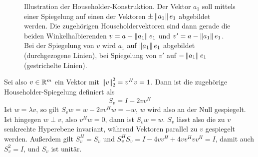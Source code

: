 \begin{figure}
  \centering

  \caption{Illustration der Householder-Konstruktion. Der Vektor $a_1$
    soll mittels einer Spiegelung auf einen der Vektoren
    $\pm\left\lVert{a_1}\right\rVert e_1$ abgebildet werden. Die zugehörigen
    Householdervektoren sind dann gerade die beiden Winkelhalbierenden
    $v=a+\left\lVert{a_1}\right\rVert e_1$ und $v'=a-\left\lVert{a_1}\right\rVert e_1$. Bei der Spiegelung
    von $v$ wird $a_1$ auf $\left\lVert{a_1}\right\rVert e_1$ abgebildet (durchgezogene
    Linien), bei Spiegelung von $v'$ auf $-\left\lVert{a_1}\right\rVert e_1$
    (gestrichelte Linien).}
  \label{fig:householder}
\end{figure}

Sei also $v\in\mathbb{R}^m$ ein Vektor mit $\left\lVert{v}\right\rVert^2_2=v^Hv=1$. Dann ist die
zugehörige Householder-Spiegelung definiert als
\begin{equation}
  S_v = I - 2vv^H
\end{equation}
Ist $w = \lambda v$, so gilt $S_vw = w - 2vv^Hw = -w$, $w$ wird also
an der Null gespiegelt. Ist hingegen $w\perp v$, also $v^Hw=0$, dann
ist $S_vw = w$. $S_v$ lässt also die zu $v$ senkrechte Hyperebene
invariant, während Vektoren parallel zu $v$ gespiegelt werden.
Außerdem gilt $S_v^H = S_v$ und $S_v^HS_v = I - 4vv^H + 4vv^Hvv^H =
I$, damit auch $S_v^2=I$, und $S_v$ ist unitär.

